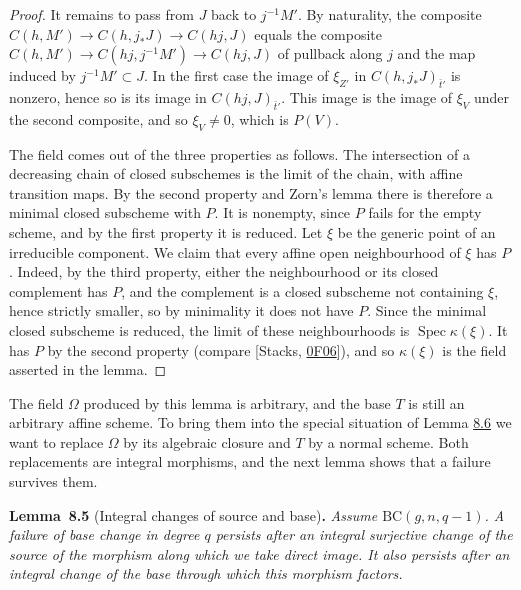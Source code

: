 \documentclass[11pt]{article}
\newenvironment{bpstatement}[2]{\par\addvspace{0.6\baselineskip}\noindent\textbf{#1}#2\textbf{.}\enspace\ignorespaces}
  {\par\addvspace{0.4\baselineskip}}
\newenvironment{bpstatementit}[2]{\begin{bpstatement}{#1}{#2}\itshape\ignorespaces}{\end{bpstatement}}
\begin{document}
\begin{proof}[{Proof}]
It remains to pass from \(J\) back to \(j^{-1}M'\). By naturality, the composite \(C(h,M')\to C(h,j_*J)\to C(hj,J)\) equals the composite \(C(h,M')\to C(hj,j^{-1}M')\to C(hj,J)\) of pullback along \(j\) and the map induced by \(j^{-1}M'\subset J\). In the first case the image of \(\xi_{Z'}\) in \(C(h,j_*J)_{\bar t'}\) is nonzero, hence so is its image in \(C(hj,J)_{\bar t'}\). This image is the image of \(\xi_V\) under the second composite, and so \(\xi_V\neq0\), which is \(P(V)\).

The field comes out of the three properties as follows. The intersection of a decreasing chain of closed subschemes is the limit of the chain, with affine transition maps. By the second property and Zorn's lemma there is therefore a minimal closed subscheme with \(P\). It is nonempty, since \(P\) fails for the empty scheme, and by the first property it is reduced. Let \(\xi\) be the generic point of an irreducible component. We claim that every affine open neighbourhood of \(\xi\) has \(P\). Indeed, by the third property, either the neighbourhood or its closed complement has \(P\), and the complement is a closed subscheme not containing \(\xi\), hence strictly smaller, so by minimality it does not have \(P\). Since the minimal closed subscheme is reduced, the limit of these neighbourhoods is \(\operatorname{Spec}\kappa(\xi)\). It has \(P\) by the second property (compare [Stacks, \href{https://stacks.math.columbia.edu/tag/0F06}{0F06}]), and so \(\kappa(\xi)\) is the field asserted in the lemma.
\end{proof}

\label{bp22}%
The field \(\Omega\) produced by this lemma is arbitrary, and the base \(T\) is still an arbitrary affine scheme. To bring them into the special situation of Lemma \hyperref[bp26]{8.6} we want to replace \(\Omega\) by its algebraic closure and \(T\) by a normal scheme. Both replacements are integral morphisms, and the next lemma shows that a failure survives them.

\label{bp23}%
\begin{bpstatementit}{Lemma~8.5}{ (Integral changes of source and base)}
Assume \(\mathrm{BC}(g,n,q-1)\). A failure of base change in degree \(q\) persists after an integral surjective change of the source of the morphism along which we take direct image. It also persists after an integral change of the base through which this morphism factors.
\end{bpstatementit}
\end{document}
